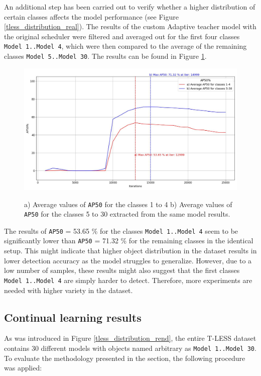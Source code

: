 An additional step has been carried out to verify whether a higher distribution of certain classes affects the model performance (see Figure \ref{tless_distribution_real}). The results of the custom Adaptive teacher model with the original scheduler were filtered and averaged out for the first four classes \texttt{Model 1..Model 4}, which were then compared to the average of the remaining classes \texttt{Model 5..Model 30}. The results can be found in Figure \ref{myModel_withOrigSched_grouped}. 
    
\begin{figure}[htb]
	\begin{center}
	\includegraphics[width=14cm]{./AP50_per_class_group.jpg}
	\end{center}
	\caption{a) Average values of \texttt{AP50} for the classes 1 to 4 b) Average values of \texttt{AP50} for the classes 5 to 30 extracted from the same model results. }
	\begin{center}
	\label{myModel_withOrigSched_grouped}
	\end{center}
\end{figure}

The results of \texttt{AP50} = 53.65 \% for the classes \texttt{Model 1..Model 4} seem to be significantly lower than \texttt{AP50} = 71.32 \% for the remaining classes in the identical setup. This might indicate that higher object distribution in the dataset results in lower detection accuracy as the model struggles to generalize. However, due to a low number of samples, these results might also suggest that the first classes \texttt{Model 1..Model 4} are simply harder to detect. Therefore, more experiments are needed with higher variety in the dataset.  

\subsection{Continual learning results}
\label{cont_learning_results} 
\FloatBarrier 
As was introduced in Figure \ref{tless_distribution_rend}, the entire T-LESS dataset contains 30 different models with objects named arbitrary as \texttt{Model 1..Model 30}. To evaluate the methodology presented in the  section, the following procedure was applied:
 
